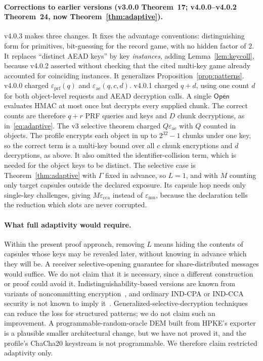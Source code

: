 \documentclass[pdflatex,sn-mathphys-num]{sn-jnl}
\theoremstyle{plain}
\theoremstyle{definition}
\begin{document}
\paragraph{Corrections to earlier versions (v3.0.0 Theorem~17; v4.0.0--v4.0.2 Theorem~24, now Theorem~\ref{thm:adaptive}).}
v4.0.3 makes three changes. It fixes the advantage conventions: distinguishing form for primitives, bit-guessing for the record game, with no hidden factor of $2$. It replaces ``distinct AEAD keys'' by key \emph{instances}, adding Lemma~\ref{lem:keycoll}, because v4.0.2 asserted without checking that the cited multi-key game already accounted for coinciding instances. It generalizes Proposition~\ref{prop:patterns}. v4.0.0 charged $\varepsilon_{\mathrm{prf}}(q)$ and $\varepsilon_{\mathrm{ae}}(q,c,d)$. v4.0.1 charged $q+d$, using one count $d$ for both object-level requests and AEAD decryption calls. A single $\mathsf{Open}$ evaluates HMAC at most once but decrypts every supplied chunk. The correct counts are therefore $q+r$ PRF queries and keys and $D$ chunk decryptions, as in~\eqref{eq:adaptive}. The v3 selective theorem charged $Q\varepsilon_{\mathrm{ae}}$ with $Q$ counted in objects. The profile encrypts each object in up to $2^{32}-1$ chunks under one key, so the correct term is a multi-key bound over all $c$ chunk encryptions and $d$ decryptions, as above. It also omitted the identifier-collision term, which is needed for the object keys to be distinct. The selective case is Theorem~\ref{thm:adaptive} with $\Gamma$ fixed in advance, so $L=1$, and with $M$ counting only target capsules outside the declared exposure. Its capsule hop needs only single-key challenges, giving $M\varepsilon_{\mathrm{cca}}$ instead of $\varepsilon_{\mathrm{mu}}$, because the declaration tells the reduction which slots are never corrupted.

\paragraph{What full adaptivity would require.}
Within the present proof approach, removing $L$ means hiding the contents of capsules whose keys may be revealed later, without knowing in advance which they will be. A receiver selective-opening guarantee for share-distributed messages would suffice. We do not claim that it is necessary, since a different construction or proof could avoid it. Indistinguishability-based versions are known from variants of noncommitting encryption~\cite{hazay2015,canetti1996}, and ordinary IND-CPA or IND-CCA security is not known to imply it~\cite{bellare2009}. Generalized-selective-decryption techniques~\cite{panjwani2007,jafargholi2017} can reduce the loss for structured patterns; we do not claim such an improvement. A programmable-random-oracle DEM built from HPKE's exporter is a plausible smaller architectural change, but we have not proved it, and the profile's ChaCha20 keystream is not programmable. We therefore claim restricted adaptivity only.
\end{document}
